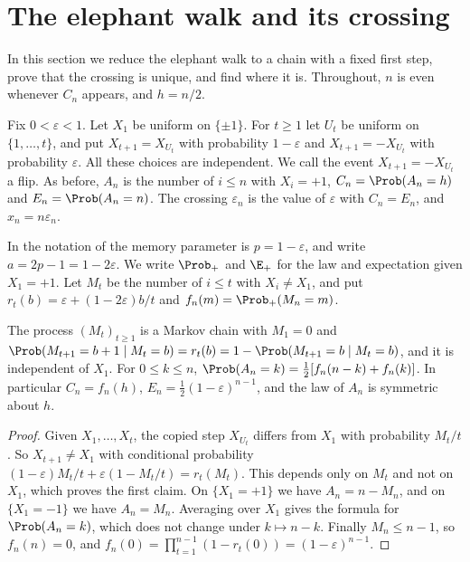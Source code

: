 \section{The elephant walk and its crossing}\label{sec:erw}

In this section we reduce the elephant walk to a chain with a fixed first
step, prove that the crossing is unique, and find where it is. Throughout,
$n$ is even whenever $C_n$ appears, and $h=n/2$.

\begin{definition}\label{def:erw}
Fix $0<\varepsilon<1$. Let $X_1$ be uniform on $\{\pm1\}$. For $t\ge1$ let
$U_t$ be uniform on $\{1,\dots,t\}$, and put $X_{t+1}=X_{U_t}$ with
probability $1-\varepsilon$ and $X_{t+1}=-X_{U_t}$ with probability
$\varepsilon$. All these choices are independent. We call the event
$X_{t+1}=-X_{U_t}$ a flip. As before, $A_n$ is the number of $i\le n$ with
$X_i=+1$, $C_n=\Prob(A_n=h)$ and $E_n=\Prob(A_n=n)$. The crossing
$\varepsilon_n$ is the value of $\varepsilon$ with $C_n=E_n$, and
$x_n=n\varepsilon_n$.
\end{definition}

In the notation of \cite{schutz2004} the memory parameter is
$p=1-\varepsilon$, and \cite{glrs2025} write $a=2p-1=1-2\varepsilon$. We
write $\Prob_+$ and $\E_+$ for the law and expectation given $X_1=+1$. Let
$M_t$ be the number of $i\le t$ with $X_i\ne X_1$, and put
$r_t(b)=\varepsilon+(1-2\varepsilon)b/t$ and $f_n(m)=\Prob_+(M_n=m)$.

\begin{lemma}\label{lem:erw-reduction}
The process $(M_t)_{t\ge1}$ is a Markov chain with $M_1=0$ and
$\Prob(M_{t+1}=b+1\mid M_t=b)=r_t(b)=1-\Prob(M_{t+1}=b\mid M_t=b)$, and it
is independent of $X_1$. For $0\le k\le n$,
$\Prob(A_n=k)=\frac12[f_n(n-k)+f_n(k)]$. In particular $C_n=f_n(h)$,
$E_n=\frac12(1-\varepsilon)^{n-1}$, and the law of $A_n$ is symmetric about
$h$.
\end{lemma}

\begin{proof}
Given $X_1,\dots,X_t$, the copied step $X_{U_t}$ differs from $X_1$ with
probability $M_t/t$. So $X_{t+1}\ne X_1$ with conditional probability
$(1-\varepsilon)M_t/t+\varepsilon(1-M_t/t)=r_t(M_t)$. This depends only on
$M_t$ and not on $X_1$, which proves the first claim. On $\{X_1=+1\}$ we
have $A_n=n-M_n$, and on $\{X_1=-1\}$ we have $A_n=M_n$. Averaging over
$X_1$ gives the formula for $\Prob(A_n=k)$, which does not change under
$k\mapsto n-k$. Finally $M_n\le n-1$, so $f_n(n)=0$, and
$f_n(0)=\prod_{t=1}^{n-1}(1-r_t(0))=(1-\varepsilon)^{n-1}$.
\end{proof}

